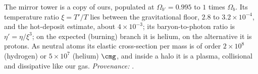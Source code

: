 The mirror tower is a copy of ours, populated at $\Omega_{b'} = 0.995$ to $1$ times $\Omega_{b}$. Its temperature ratio $\xi = T'/T$ lies between the gravitational floor, $2.8$ to $3.2 \times 10^{-4}$, and the hot-deposit estimate, about $4 \times 10^{-3}$; its baryon-to-photon ratio is $\eta' = \eta/\xi^{3}$; on the expected (burning) branch it is helium, on the alternative it is protons. As neutral atoms its elastic cross-section per mass is of order $2 \times 10^{8}$ (hydrogen) or $5 \times 10^{7}$ (helium) $\cmg$, and inside a halo it is a plasma, collisional and dissipative like our gas. \emph{Provenance:} \cite[Thm.~4.3, Props.~4.6 and 4.7, Prop.~6.2]{ButlerT14}.
